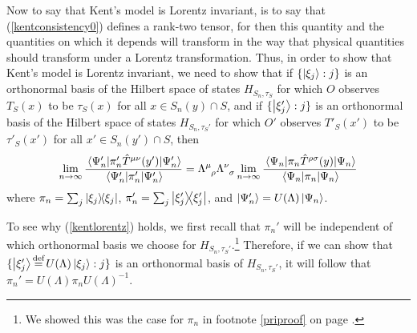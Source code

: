 Now to say that Kent's model is Lorentz invariant, is to say that (\ref{kentconsistency0}) defines a rank-two tensor, for then this quantity and the quantities on which it depends will transform in the way that physical quantities should transform under a Lorentz transformation. Thus, in order to show that Kent's model is Lorentz invariant, we need to show that if $\{\ket{\xi_j}:j\}$ is an orthonormal basis of the Hilbert space of states $H_{S_n,\tau_S}$ for which $O$ observes $T_S(x)$ to be $\tau_S(x)$ for all $x\in S_n(y)\cap S$, and if $\{\ket{\xi_j'}:j\}$ is an orthonormal basis of the Hilbert space of states $H_{S_n,\tau_S'}$ for which $O'$ observes $T'_S(x')$ to be $\tau'_S(x')$ for all $x'\in S_n(y')\cap S$, then
\begin{equation}\label{kentlorentz}
\lim_{n\rightarrow\infty}\frac{\ev{\pi_n'\hat{T}^{\mu\nu}(y')}{\Psi_n'}}{\ev{\pi_n'}{\Psi_n'}}=\Lambda\indices{^\mu_\rho}\Lambda\indices{^\nu_\sigma} \lim_{n\rightarrow\infty}\frac{\ev{\pi_n\hat{T}^{\rho\sigma}(y)}{\Psi_n}}{\ev{\pi_n}{\Psi_n}}
\end{equation}
where $\pi_n=\sum_j\dyad{\xi_j}$, $\pi_n'=\sum_j\dyad{\xi_j'}$, and $\ket{\Psi_n'}=U(\Lambda)\ket{\Psi_n}$. 

To see why (\ref{kentlorentz}) holds, we first recall that $\pi_n'$ will be independent of which orthonormal basis we choose for $H_{S_n,\tau_S'}$.\footnote{We showed this was the case for $\pi_n$ in footnote \ref{priproof} on page \pageref{priproof}.} Therefore, if we can show that $\{\ket{\xi_j'}\myeq U(\Lambda)\ket{\xi_j}:j\}$ is an orthonormal basis of $H_{S_n,\tau_S'}$, it will follow that $\pi_n'=U(\Lambda)\pi_nU(\Lambda)^{-1}$. 

